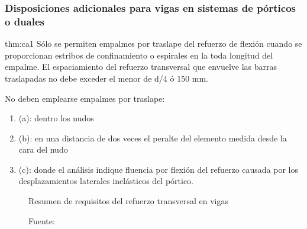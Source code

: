 \subsubsection{Disposiciones adicionales para vigas en sistemas de pórticos o duales}
\begin{theo}[Art. 21.4.4.4 y 21.5.3.2 :]{thm:ca1}
Sólo se permiten empalmes por traslape del refuerzo de flexión cuando se proporcionan estribos de confinamiento o espirales en la toda longitud del empalme.   El espaciamiento del refuerzo transversal que envuelve las barras traslapadas no debe exceder el menor de d/4 ó 150 mm.
\end{theo}
\newpage
\noindent No deben emplearse empalmes por traslape:
\begin{enumerate}
\item[] (a): dentro los nudos
\item[] (b): en una distancia de dos veces el peralte del elemento medida desde la cara del nudo
\item[] (c): donde  el  análisis  indique  fluencia  por  flexión  del  refuerzo causada  por  los desplazamientos laterales inelásticos del pórtico.
\end{enumerate}
\begin{figure}[h!]
    \centering
      \caption{Resumen de requisitos del refuerzo transversal en vigas}
    \hspace{0mm}
    \caption*{Fuente: \cite{CAPUCP}}
    \label{reqv}
\end{figure}
